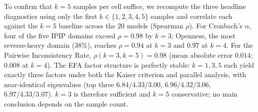 \documentclass[11pt]{article}
\begin{document}
To confirm that $k{=}5$ samples per cell suffice, we recompute the three headline diagnostics using only the first $k \in \{1,2,3,4,5\}$ samples and correlate each against the $k{=}5$ baseline across the 20 models (Spearman $\rho$). For Cronbach's $\alpha$, four of the five IPIP domains exceed $\rho{=}0.98$ by $k{=}3$; Openness, the most reverse-heavy domain ($38\%$), reaches $\rho{=}0.94$ at $k{=}3$ and $0.97$ at $k{=}4$. For the Pairwise Inconsistency Rate, $\rho(k{=}3,k{=}5)=0.98$ (mean absolute error $0.014$; $0.008$ at $k{=}4$). The EFA factor structure is perfectly stable: $k{=}1,3,5$ each yield exactly three factors under both the Kaiser criterion and parallel analysis, with near-identical eigenvalues (top three $6.84/4.33/3.00$, $6.96/4.32/3.06$, $6.97/4.33/3.07$). $k{=}3$ is therefore sufficient and $k{=}5$ conservative; no main conclusion depends on the sample count.
\end{document}
